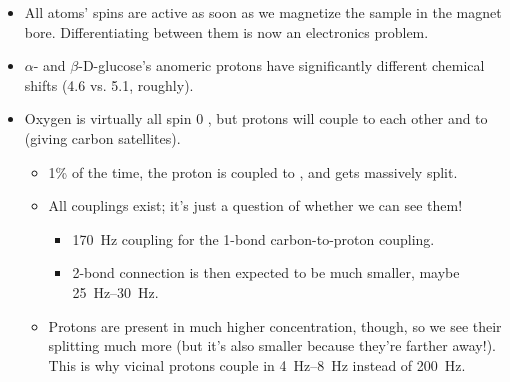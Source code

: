 \documentclass[../notes.tex]{subfiles}
\begin{document}
\begin{itemize}
\begin{figure}[h!]
        \caption{Chemical shift ranges of common nuclei.}
        \label{fig:shiftCommon}
    \end{figure}
    \begin{itemize}
        \item The range of chemical signals we'll see is tiny, though; only about \SI{6000}{\hertz} if we're talking about a \SI{10}{\partspermillion} window.
        \item Different nuclei appear in different windows and with different ranges (think of how carbon is 0-200 ppm vs. proton -5-15!!).
        \item Note that the ranges in Figure \ref{fig:shiftCommon} are to scale relative to each other, but have been scaled up absolutely by 10 times.
    \end{itemize}
    \item All atoms' spins are active as soon as we magnetize the sample in the magnet bore. Differentiating between them is now an electronics problem.
    \item $\alpha$- and $\beta$-D-glucose's anomeric protons have significantly different chemical shifts (\SI{4.6}{\partspermillion} vs. \SI{5.1}{\partspermillion}, roughly).
    \item Oxygen is virtually all spin 0 , but protons will couple to each other and to  (giving carbon satellites).
    \begin{itemize}
        \item 1\% of the time, the proton is coupled to , and gets massively split.
        \item All couplings exist; it's just a question of whether we can see them!
        \begin{itemize}
            \item \SI{170}{\hertz} coupling for the 1-bond carbon-to-proton coupling.
            \item 2-bond connection is then expected to be much smaller, maybe \SIrange{25}{30}{\hertz}.
        \end{itemize}
        \item Protons are present in much higher concentration, though, so we see their splitting much more (but it's also smaller because they're farther away!). This is why vicinal protons couple in \SIrange{4}{8}{\hertz} instead of \SI{200}{\hertz}.

\end{itemize}
\end{itemize}
\end{document}
